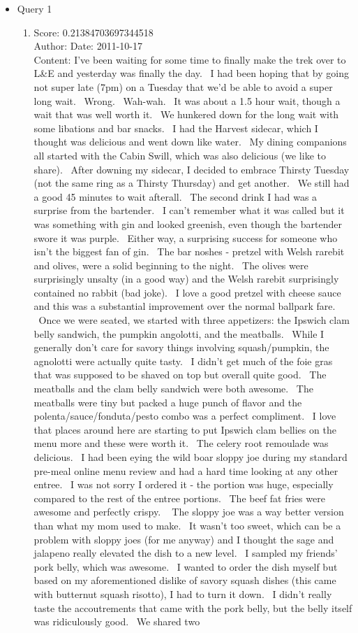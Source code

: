 \documentclass[paper=a4, fontsize=11pt]{jhwhw} %
\begin{document}
\begin{itemize}
    \item Query 1
        \begin{enumerate}
            \item Score: 0.21384703697344518\\ 
                 Author: 
                Date: 2011-10-17\\
                Content: I've been waiting for some time to finally make the trek over to L\&E and yesterday was finally the day.  I had been hoping that by going not super late (7pm) on a Tuesday that we'd be able to avoid a super long wait.  Wrong.  Wah-wah.  It was about a 1.5 hour wait, though a wait that was well worth it.  We hunkered down for the long wait with some libations and bar snacks.  I had the Harvest sidecar, which I thought was delicious and went down like water.  My dining companions all started with the Cabin Swill, which was also delicious (we like to share).  After downing my sidecar, I decided to embrace Thirsty Tuesday (not the same ring as a Thirsty Thursday) and get another.  We still had a good 45 minutes to wait afterall.  The second drink I had was a surprise from the bartender.  I can't remember what it was called but it was something with gin and looked greenish, even though the bartender swore it was purple.  Either way, a surprising success for someone who isn't the biggest fan of gin.  The bar noshes - pretzel with Welsh rarebit and olives, were a solid beginning to the night.  The olives were surprisingly unsalty (in a good way) and the Welsh rarebit surprisingly contained no rabbit (bad joke).  I love a good pretzel with cheese sauce and this was a substantial improvement over the normal ballpark fare.  Once we were seated, we started with three appetizers: the Ipswich clam belly sandwich, the pumpkin angolotti, and the meatballs.  While I generally don't care for savory things involving squash/pumpkin, the agnolotti were actually quite tasty.  I didn't get much of the foie gras that was supposed to be shaved on top but overall quite good.  The meatballs and the clam belly sandwich were both awesome.  The meatballs were tiny but packed a huge punch of flavor and the polenta/sauce/fonduta/pesto combo was a perfect compliment.  I love that places around here are starting to put Ipswich clam bellies on the menu more and these were worth it.  The celery root remoulade was delicious.  I had been eying the wild boar sloppy joe during my standard pre-meal online menu review and had a hard time looking at any other entree.  I was not sorry I ordered it - the portion was huge, especially compared to the rest of the entree portions.  The beef fat fries were awesome and perfectly crispy.   The sloppy joe was a way better version than what my mom used to make.  It wasn't too sweet, which can be a problem with sloppy joes (for me anyway) and I thought the sage and jalapeno really elevated the dish to a new level.  I sampled my friends' pork belly, which was awesome.  I wanted to order the dish myself but based on my aforementioned dislike of savory squash dishes (this came with butternut squash risotto), I had to turn it down.  I didn't really taste the accoutrements that came with the pork belly, but the belly itself was ridiculously good.  We shared two 
\end{enumerate}
\end{itemize}
\end{document}
